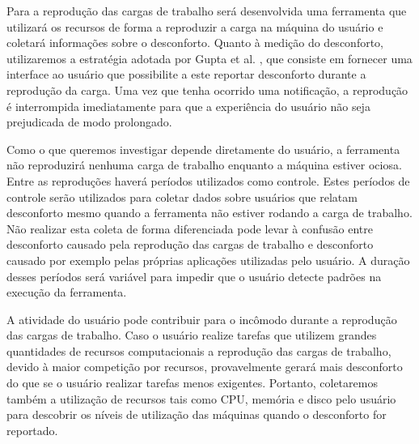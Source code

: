 \documentclass[a4paper,10pt]{article}
\begin{document}
Para a reprodução das cargas de trabalho será desenvolvida uma ferramenta que 
utilizará os recursos de forma a reproduzir a carga na máquina do
usuário e coletará informações sobre o desconforto. Quanto à medição do
desconforto, utilizaremos a estratégia adotada por Gupta et
al.\cite{Gupta:2004:MUU:1032647.1033307}
\cite{Dinda:2007:UEC:1287050.1287061}, que consiste em fornecer uma interface ao
usuário que possibilite a este reportar desconforto durante a reprodução da
carga. Uma vez que tenha ocorrido
uma notificação, a reprodução é interrompida imediatamente para que a
experiência do usuário não seja prejudicada de modo prolongado.

Como o que queremos investigar depende diretamente do usuário, a ferramenta não 
reproduzirá nenhuma carga de trabalho enquanto a máquina estiver ociosa. Entre
as reproduções haverá períodos utilizados como controle. Estes períodos de
controle serão utilizados para coletar dados sobre usuários que relatam
desconforto mesmo quando a ferramenta não estiver rodando a carga de trabalho.
Não realizar esta coleta de forma diferenciada pode levar à confusão entre
desconforto causado pela reprodução das cargas de trabalho e desconforto
causado por exemplo pelas próprias aplicações utilizadas pelo usuário.
A duração desses períodos será variável para impedir que o usuário detecte padrões
na execução da ferramenta.


A atividade do usuário pode contribuir para o incômodo durante a reprodução das
cargas de trabalho. Caso o usuário realize tarefas que utilizem grandes
quantidades de recursos computacionais a reprodução das cargas de trabalho,
devido à maior competição por recursos, provavelmente gerará mais desconforto do
que se o usuário realizar tarefas menos exigentes. Portanto, coletaremos também
a utilização de recursos tais como CPU, memória e disco pelo usuário para
descobrir os níveis de utilização das máquinas quando o desconforto for
reportado.
\end{document}
